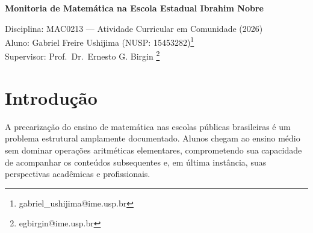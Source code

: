 \documentclass[11pt]{article}
\begin{document}
\begin{center}

	\textbf{\LARGE Monitoria de Matemática na Escola Estadual Ibrahim Nobre}

	\vspace{2em}

	\large{
		Disciplina: MAC0213 --- Atividade Curricular em Comunidade (2026) \\
		Aluno: Gabriel Freire Ushijima (NUSP: 15453282)\footnote{gabriel\_ushijima@ime.usp.br} \\
		Supervisor: Prof.\ Dr.\ Ernesto G. Birgin \footnote{egbirgin@ime.usp.br} \\
	}

	\vspace{1em}

\end{center}

\begin{abstract}
Este relatório descreve a atividade de monitoria de matemática realizada na Escola Estadual Ibrahim Nobre, no primeiro semestre de 2026, como parte da disciplina MAC0213 --- Atividade Curricular em Comunidade. A atividade consistiu em duas sessões semanais de acompanhamento a turmas do ensino médio com dificuldades significativas em matemática: às terças-feiras, em aulas de nivelamento do terceiro ano; às quartas-feiras, em aulas de nivelamento do primeiro ano. Ao longo do semestre, foram realizadas 34 visitas à escola, totalizando 102 horas de atividade. Os resultados evidenciam lacunas profundas em aritmética básica em ambas as turmas, agravadas por dificuldades de engajamento, especialmente no primeiro ano. Apesar dos obstáculos, foram observados progressos pontuais e situações de aprendizagem genuína, reforçando a relevância do trabalho de monitoria como intervenção complementar ao ensino regular.
\end{abstract}

\section{Introdução}

A precarização do ensino de matemática nas escolas públicas brasileiras é um problema estrutural amplamente documentado. Alunos chegam ao ensino médio sem dominar operações aritméticas elementares, comprometendo sua capacidade de acompanhar os conteúdos subsequentes e, em última instância, suas perspectivas acadêmicas e profissionais.
\end{document}
